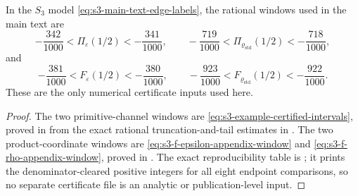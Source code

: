 \begin{lemma}
  \label{lem:s3-main-text-certificate-summary}
  In the \(S_3\) model \eqref{eq:s3-main-text-edge-labels}, the rational
  windows used in the main text are
  \[
    -\frac{342}{1000}<\Pi_\varepsilon(1/2)<-\frac{341}{1000},
    \qquad
    -\frac{719}{1000}<\Pi_{\varrho_{\mathrm{std}}}(1/2)<-\frac{718}{1000},
  \]
  and
  \[
    -\frac{381}{1000}<F_\varepsilon(1/2)<-\frac{380}{1000},
    \qquad
    -\frac{923}{1000}<F_{\varrho_{\mathrm{std}}}(1/2)<-\frac{922}{1000}.
  \]
  These are the only numerical certificate inputs used here.
\end{lemma}

\begin{proof}
  The two primitive-channel windows are
  \eqref{eq:s3-example-certified-intervals}, proved in
   from the exact rational
  truncation-and-tail estimates in
  .  The two product-coordinate
  windows are
  \eqref{eq:s3-f-epsilon-appendix-window} and
  \eqref{eq:s3-f-rho-appendix-window}, proved in
  .  The exact reproducibility
  table is ; it prints the
  denominator-cleared positive integers for all eight endpoint comparisons, so
  no separate certificate file is an analytic or publication-level input.
\end{proof}


